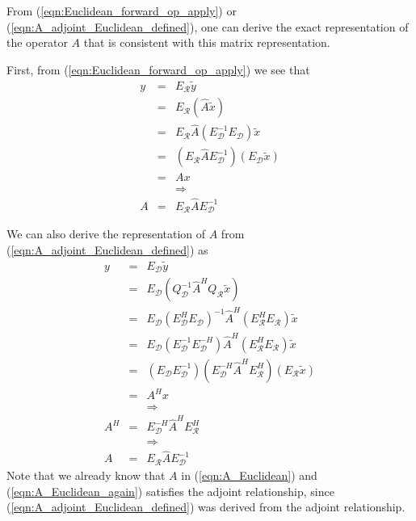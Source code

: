 \documentclass[pdf,ps2pdf,11pt]{SANDreport}
\begin{document}
From (\ref{eqn:Euclidean_forward_op_apply}) or
(\ref{eqn:A_adjoint_Euclidean_defined}), one can derive the exact
representation of the operator $A$ that is consistent with this matrix
representation.

First, from (\ref{eqn:Euclidean_forward_op_apply}) we see that
%
\begin{eqnarray}
y
& = & E_{\mathcal{R}} \tilde{y} \nonumber \\
& = & E_{\mathcal{R}} ( \hat{A} \tilde{x} ) \nonumber \\
& = & E_{\mathcal{R}} \hat{A} ( E_{\mathcal{D}}^{-1} E_{\mathcal{D}} ) \tilde{x} \nonumber \\
& = & ( E_{\mathcal{R}} \hat{A} E_{\mathcal{D}}^{-1} ) ( E_{\mathcal{D}} \tilde{x} ) \nonumber \\
& = & A x \nonumber \\
&  & \Rightarrow \nonumber \\
A & = & E_{\mathcal{R}} \hat{A} E_{\mathcal{D}}^{-1}
\label{eqn:A_Euclidean}
\end{eqnarray}
%

We can also derive the representation of $A$ from
(\ref{eqn:A_adjoint_Euclidean_defined}) as
%
\begin{eqnarray}
y
& = & E_{\mathcal{D}} \tilde{y} \nonumber \\
& = & E_{\mathcal{D}} ( Q_{\mathcal{D}}^{-1} \hat{A}^H Q_{\mathcal{R}} \tilde{x} ) \nonumber \\
& = & E_{\mathcal{D}} ( E_{\mathcal{D}}^H E_{\mathcal{D}} )^{-1} \hat{A}^H ( E_{\mathcal{R}}^H E_{\mathcal{R}} ) \tilde{x} \nonumber \\
& = & E_{\mathcal{D}} ( E_{\mathcal{D}}^{-1} E_{\mathcal{D}} ^{-H} ) \hat{A}^H ( E_{\mathcal{R}}^H E_{\mathcal{R}} ) \tilde{x} \nonumber \\
& = & ( E_{\mathcal{D}} E_{\mathcal{D}}^{-1} ) ( E_{\mathcal{D}} ^{-H} \hat{A}^H E_{\mathcal{R}}^H ) ( E_{\mathcal{R}} \tilde{x} ) \nonumber \\
& = & A^H x \nonumber \\
&  & \Rightarrow \nonumber \\
A^H & = & E_{\mathcal{D}}^{-H} \hat{A}^H E_{\mathcal{R}}^H  \nonumber \\
\label{eqn:A_Euclidean_adjoint} 
&  & \Rightarrow \nonumber \\
A & = & E_{\mathcal{R}} \hat{A} E_{\mathcal{D}}^{-1}
\label{eqn:A_Euclidean_again}
\end{eqnarray}
%
Note that we already know that $A$ in (\ref{eqn:A_Euclidean}) and
(\ref{eqn:A_Euclidean_again}) satisfies the adjoint relationship, since
(\ref{eqn:A_adjoint_Euclidean_defined}) was derived from the adjoint
relationship.
\end{document}
